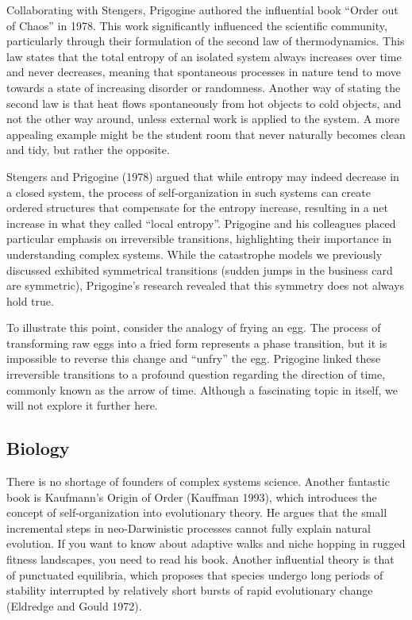\documentclass[
  a4paper,
  DIV=11,
  numbers=noendperiod,
  oneside]{scrreprt}
\begin{document}
Collaborating with Stengers, Prigogine authored the influential book
``Order out of Chaos'' in 1978. This work significantly influenced the
scientific community, particularly through their formulation of the
second law of thermodynamics. This law states that the total entropy of
an isolated system always increases over time and never decreases,
meaning that spontaneous processes in nature tend to move towards a
state of increasing disorder or randomness. Another way of stating the
second law is that heat flows spontaneously from hot objects to cold
objects, and not the other way around, unless external work is applied
to the system. A more appealing example might be the student room that
never naturally becomes clean and tidy, but rather the opposite.

Stengers and Prigogine (1978) argued that while entropy may indeed
decrease in a closed system, the process of self-organization in such
systems can create ordered structures that compensate for the entropy
increase, resulting in a net increase in what they called ``local
entropy''. Prigogine and his colleagues placed particular emphasis on
irreversible transitions, highlighting their importance in understanding
complex systems. While the catastrophe models we previously discussed
exhibited symmetrical transitions (sudden jumps in the business card are
symmetric), Prigogine's research revealed that this symmetry does not
always hold true.

To illustrate this point, consider the analogy of frying an egg. The
process of transforming raw eggs into a fried form represents a phase
transition, but it is impossible to reverse this change and ``unfry''
the egg. Prigogine linked these irreversible transitions to a profound
question regarding the direction of time, commonly known as the arrow of
time. Although a fascinating topic in itself, we will not explore it
further here.

\hypertarget{sec-Biology}{%
\subsection{Biology}\label{sec-Biology}}

There is no shortage of founders of complex systems science. Another
fantastic book is Kaufmann's Origin of Order (Kauffman 1993), which
introduces the concept of self-organization into evolutionary theory. He
argues that the small incremental steps in neo-Darwinistic processes
cannot fully explain natural evolution. If you want to know about
adaptive walks and niche hopping in rugged fitness landscapes, you need
to read his book. Another influential theory is that of punctuated
equilibria, which proposes that species undergo long periods of
stability interrupted by relatively short bursts of rapid evolutionary
change (Eldredge and Gould 1972).
\end{document}
